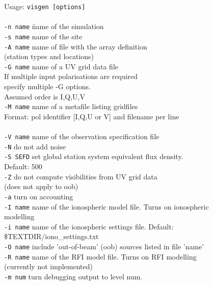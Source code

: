 \documentclass[letterpaper, oneside, 11pt]{article}
\begin{document}
\begin{tabbing}
Usage: {\tt visgen [options]} \\
\\
{\tt -n name}  \hspace{5mm} \= name of the simulation \\
{\tt -s name}  \>name of the site \\
{\tt -A name}  \>name of file with the array definition \\
                      \>(station types and locations) \\
{\tt -G name}  \>name of a UV grid data file \\
                    \>If multiple input polarisations are required \\
                    \>specify multiple -G options. \\
                    \>Assumed order is I,Q,U,V \\
{\tt -M name}  \>name of a metafile listing gridfiles \\
                 \>Format: pol identifier [I,Q,U or V] and filename per line \\
                  \\
{\tt -V name}  \>name of the observation specification file \\
{\tt -N}       \>do not add noise \\
{\tt -S SEFD}  \>set global station system equivalent flux density.  \\
		      \>Default: 500 \\
{\tt -Z}       \>do not compute visibilities from UV grid data \\
		      \>(does not apply to oob) \\
{\tt -a}       \>turn on accounting \\
{\tt -I name}  \>name of the ionospheric model file. Turns on ionospheric \\
		      \>modelling \\
{\tt -i name}  \>name of the ionospheric settings file. Default: \\
	       \> \$TEXTDIR/iono\_settings.txt \\
{\tt -O name}  \>include 'out-of-beam' (oob) sources listed in file 'name' \\
{\tt -R name}  \>name of the RFI model file. Turns on RFI modelling \\
		      \>(currently not implemented) \\
{\tt -m num}   \>turn debugging output to level num. \\

\end{tabbing}
\end{document}
